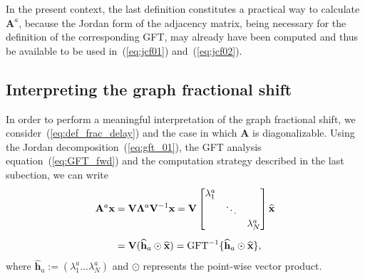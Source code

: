 In the present context, the last definition constitutes a practical way to calculate $\mathbf{A}^a$, because the Jordan form of the adjacency matrix, being necessary for the definition of the corresponding GFT, may already have been computed and thus be available to be used in~(\ref{eq:jcf01}) and~(\ref{eq:jcf02}).


\subsection{Interpreting the graph fractional shift}\label{subsec:interpret}
In order to perform a meaningful interpretation of the graph fractional shift, we consider~(\ref{eq:def_frac_delay}) and the case in which $\mathbf{A}$ is diagonalizable. Using the Jordan decomposition~(\ref{eq:gft_01}), the GFT analysis equation~(\ref{eq:GFT_fwd}) and the computation strategy described in the last subection, we can write
\begin{align}\label{eq:frac_delay_01}
\mathbf{A}^a \mathbf{x} &= \mathbf{V} \mathbf{\Lambda}^a \mathbf{V}^{-1} \mathbf{x} = \mathbf{V}
\begin{bmatrix}
\lambda_1^a &  & \\ 
& \ddots & \\ 
&  & \lambda_N^a
\end{bmatrix}
\widehat{\mathbf{x}} \notag \\[0.5em]
&= \mathbf{V} (\widehat{\mathbf{h}}_a \odot \widehat{\mathbf{x}}) = \text{GFT}^{-1} \{\widehat{\mathbf{h}}_a \odot \widehat{\mathbf{x}}\},
\end{align}
where $\widehat{\mathbf{h}}_a := (\lambda_1^a \ldots \lambda_N^a)$ and $\odot$ represents the point-wise vector product.

